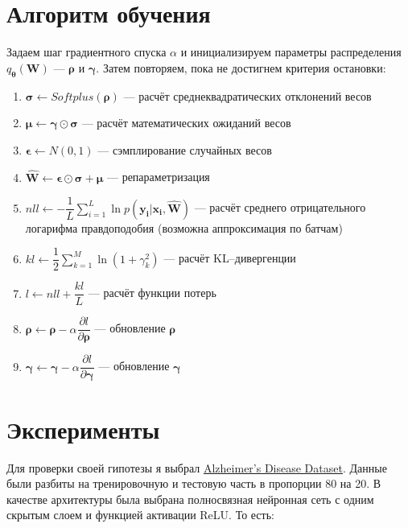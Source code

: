 \documentclass{article}
\begin{document}
    \section{Алгоритм обучения}

    Задаем шаг градиентного спуска $\alpha$ и инициализируем параметры распределения $q_{\pmb{\theta}}(\pmb{W})$ — $\pmb{\rho}$ и $\pmb{\gamma}$. Затем повторяем, пока не достигнем критерия остановки:
    \begin{enumerate}
        \item $\pmb{\sigma} \leftarrow Softplus(\pmb{\rho})$ --- расчёт среднеквадратических отклонений весов
        \item $\pmb{\mu} \leftarrow \pmb{\gamma} \odot \pmb{\sigma}$ --- расчёт математических ожиданий весов
        \item $\pmb{\epsilon} \leftarrow N(0, 1)$ --- сэмплирование случайных весов
        \item $\hat{\pmb{W}} \leftarrow \pmb{\epsilon} \odot \pmb{\sigma} + \pmb{\mu}$ --- репараметризация
        \item $nll \leftarrow -\dfrac{1}{L}\sum_{i=1}^{L}{\ln{p( \pmb{y_{i}} | \pmb{x_{i}}, \pmb{\hat{W}})}}$ --- расчёт среднего отрицательного логарифма правдоподобия (возможна аппроксимация по батчам)
        \item $kl \leftarrow \dfrac{1}{2}\sum_{k=1}^{M}\ln({1 + \gamma_{k}^{2}})$ --- расчёт KL--дивергенции
        \item $l \leftarrow nll + \dfrac{kl}{L}$ --- расчёт функции потерь
        \item $\pmb{\rho} \leftarrow \pmb{\rho} - \alpha \dfrac{\partial l}{\partial \pmb{\rho}}$ --- обновление $\pmb{\rho}$
        \item $\pmb{\gamma} \leftarrow \pmb{\gamma} - \alpha \dfrac{\partial l}{\partial \pmb{\gamma}}$ --- обновление $\pmb{\gamma}$
    \end{enumerate}

    \section{Эксперименты}

    Для проверки своей гипотезы я выбрал \href{https://www.kaggle.com/datasets/rabieelkharoua/alzheimers-disease-dataset}{Alzheimer's Disease Dataset}. Данные были разбиты на тренировочную и тестовую часть в пропорции 80 на 20. В качестве архитектуры была выбрана полносвязная нейронная сеть с одним скрытым слоем и функцией активации ReLU. То есть:
\end{document}
